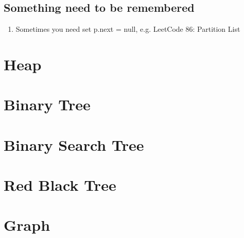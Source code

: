 \section{ Something need to be remembered  }

\begin{enumerate}
    \item Sometimes you need set p.next = null, e.g. LeetCode 86: Partition List


\end{enumerate}


\chapter{ Heap }

\chapter{ Binary Tree }

\chapter{ Binary Search Tree }

\chapter{ Red Black Tree }

\chapter{ Graph }

